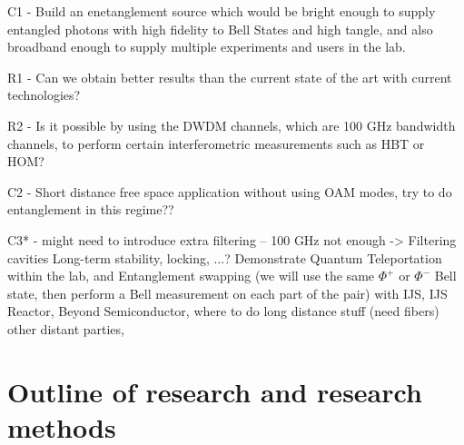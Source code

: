 \documentclass{article}
\theoremstyle{mytheoremstyle}
\theoremstyle{mytheoremstyle}
\theoremstyle{myproblemstyle}
\begin{document}
C1 - Build an enetanglement source which would be bright enough to supply entangled photons with high
fidelity to Bell States and high tangle, and also broadband enough to supply multiple experiments and users in the lab.

R1 - Can we obtain better results than the current state of the art with current technologies?

R2 - Is it possible by using the DWDM channels, which are 100 GHz bandwidth channels, to perform certain interferometric
measurements such as HBT or HOM?



C2 - Short distance free space application without using OAM modes, try to do entanglement in this regime??

C3* - might need to introduce extra filtering -- 100 GHz not enough -> Filtering cavities
Long-term stability, locking, ...? Demonstrate Quantum Teleportation within the lab, and Entanglement swapping (we will use the same $\Phi^+$ or $\Phi^-$ Bell state,
then perform a Bell measurement on each part of the pair) with IJS, IJS Reactor, Beyond Semiconductor, where to do
long distance stuff (need fibers) other distant parties,



\section{Outline of research and research methods}
\end{document}
